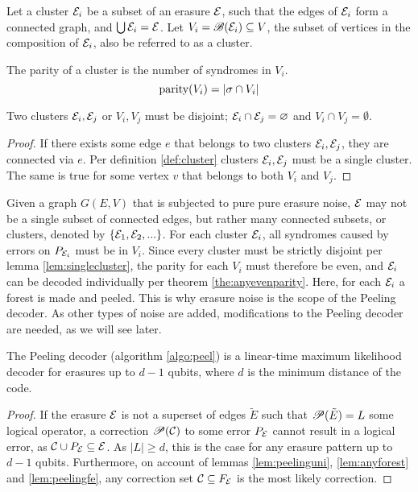 \begin{definition}\label{def:cluster}
  Let a cluster $\mathcal{E}_i$ be a subset of an erasure $\mathcal{E}$, such that the edges of $\mathcal{E}_i$ form a connected graph, and $\bigcup \mathcal{E}_i = \mathcal{E}$. Let $V_i=\mathscr{B}(\mathcal{E}_i)\subseteq V$, the subset of vertices in the composition of $\mathcal{E}_i$, also be referred to as a cluster.
\end{definition}
\begin{definition}\label{def:clusterparity}
  The parity of a cluster is the number of syndromes in $V_i$.
  \begin{equation}\label{eq:clusterparity}
    \text{parity}(V_i) = \abs{\sigma \cap V_i}
  \end{equation}
\end{definition}
\begin{lemma}\label{lem:singlecluster}
  Two clusters $\mathcal{E}_i, \mathcal{E}_j$ or $V_i, V_j$ must be disjoint; $\mathcal{E}_i\cap \mathcal{E}_j = \varnothing$ and $V_i\cap V_j=\emptyset$. 
\end{lemma}
\begin{proof}
  If there exists some edge $e$ that belongs to two clusters $\mathcal{E}_i, \mathcal{E}_j$, they are connected via $e$. Per definition \ref{def:cluster} clusters $\mathcal{E}_i, \mathcal{E}_j$ must be a single cluster. The same is true for some vertex $v$ that belongs to both $V_i$ and $V_j$.
\end{proof}
Given a graph $G(E,V)$ that is subjected to pure pure erasure noise, $\mathcal{E}$ may not be a single subset of connected edges, but rather many connected subsets, or clusters, denoted by $\{\mathcal{E}_1, \mathcal{E}_2,...\}$. For each cluster $\mathcal{E}_i$, all syndromes caused by errors on $P_{\mathcal{E}_i}$ must be in $V_i$. Since every cluster must be strictly disjoint per lemma \ref{lem:singlecluster}, the parity for each $V_i$ must therefore be even, and $\mathcal{E}_i$ can be decoded individually per theorem \ref{the:anyevenparity}. Here, for each $\mathcal{E}_i$ a forest is made and peeled. This is why erasure noise is the scope of the Peeling decoder. As other types of noise are added, modifications to the Peeling decoder are needed, as we will see later.
\begin{theorem}
  The Peeling decoder (algorithm \ref{algo:peel}) is a linear-time maximum likelihood decoder for erasures up to $d-1$ qubits, where $d$ is the minimum distance of the code.
\end{theorem}
\begin{proof}
  If the erasure $\mathcal{E}$ is not a superset of edges $\tilde{E}$ such that $\mathscr{P}(\tilde{E})=L$ some logical operator, a correction $\mathscr{P}(\mathcal{C})$ to some error $P_{\mathcal{E}}$ cannot result in a logical error, as $\mathcal{C}\cup P_{\mathcal{E}}\subseteq \mathcal{E}$. As $|L|\geq d$, this is the case for any erasure pattern up to $d-1$ qubits. Furthermore, on account of lemmas \ref{lem:peelinguni}, \ref{lem:anyforest} and \ref{lem:peelingfe}, any correction set $\mathcal{C}\subseteq F_{\mathcal{E}}$ is the most likely correction.
\end{proof}

